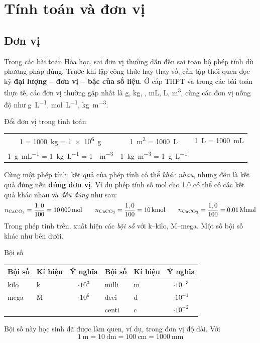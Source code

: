 \section{Tính toán và đơn vị}
\subsection*{Đơn vị}
Trong các bài toán Hóa học, sai đơn vị thường dẫn đến sai toàn bộ phép tính dù phương pháp đúng. Trước khi lập công thức hay thay số, cần tập thói quen đọc kỹ \textbf{đại lượng -- đơn vị -- bậc của số liệu}. Ở cấp THPT và trong các bài toán thực tế, các đơn vị thường gặp nhất là \si{\gram}, \si{\kilo\gram}, \si{\ton}, \si{\milli\liter}, \si{\liter}, \si{\cubic\metre}, cùng các đơn vị nồng độ như \si{\gram\per\liter}, \si{\mole\per\liter}, \si{\kilo\gram\per\cubic\metre}.

\begin{ghinho}{Đổi đơn vị trong tính toán}
\begin{center}
	\begin{tabular}{ccc}
		\SI{1}{\ton} = \SI{1000}{\kilo\gram} =  \SI{1e6}{\gram} &
		\SI{1}{\cubic\metre} = \SI{1000}{\liter} &
		\SI{1}{\liter} = \SI{1000}{\milli\liter} \\
		\SI{1}{\gram\per\milli\liter} = \SI{1}{\kilo\gram\per\liter} = \SI{1}{\ton\per\cubic\metre}&
		\SI{1}{\kilo\gram\per\cubic\metre} = \SI{1}{\gram\per\liter} &
	\end{tabular}
\end{center}
\end{ghinho}
Cùng một phép tính, kết quả của phép tính có thể \emph{khác nhau}, nhưng đều là kết quả đúng nếu \textbf{đúng đơn vị}. Ví dụ phép tính số mol cho \SI{1,0}{\ton}  có thể có các kết quả khác nhau và \emph{đều đúng} như sau:
\[
	n_{\ce{CaCO3}} = \dfrac{1,0}{100} = \SI{10000}{\mole} \qquad
	n_{\ce{CaCO3}} = \dfrac{1,0}{100} = \SI{10}{\kilo\mole} \qquad
	n_{\ce{CaCO3}} = \dfrac{1,0}{100} = \SI{0,01}{\mega\mole}
\]
Trong phép tính trên, xuất hiện các \emph{bội số} với k--kilo, M--mega. Một số bội số khác như bên dưới.
\begin{ghinho}{Bội số}
	\begin{center}
		\begin{tabular}{llc||llc}
			Bội số & Kí hiệu & Ý nghĩa & Bội số & Kí hiệu & Ý nghĩa \\
			\midrule
			kilo & k & $\cdot 10^3$ & milli & m & $\cdot 10^{-3}$ \\
			mega & M & $\cdot 10^6$ & deci & d & $\cdot 10^{-1}$ \\
				&	&				& centi & c & $\cdot 10^{-2}$ \\
		\end{tabular}
	\end{center}
\end{ghinho}
Bội số này học sinh đã được làm quen, ví dụ, trong đơn vị độ dài. Với
\[ \SI{1}{\metre} = \SI{10}{\deci\metre} = \SI{100}{\centi\metre} = \SI{1000}{\milli\metre}\]

